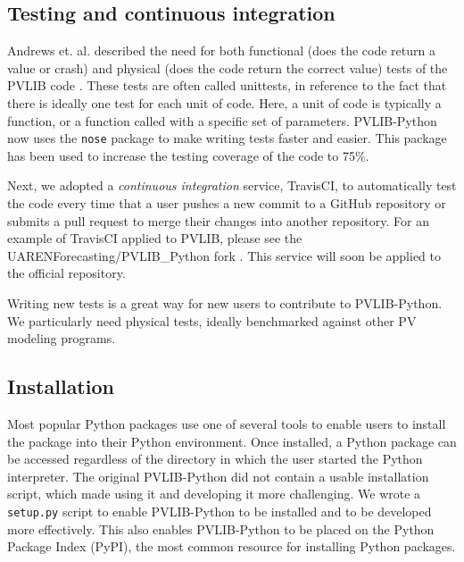 \documentclass[conference]{IEEEtran}
\begin{document}
\subsection{Testing and continuous integration}

Andrews et. al. described the need for both functional (does the code return a value or crash) and physical (does the code return the correct value) tests of the PVLIB code \cite{andrews}.
These tests are often called unittests, in reference to the fact that there is ideally one test for each unit of code.
Here, a unit of code is typically a function, or a function called with a specific set of parameters.
PVLIB-Python now uses the \texttt{nose} package \cite{nosetests} to make writing tests faster and easier.
This package has been used to increase the testing coverage of the code to 75\%.

Next, we adopted a \emph{continuous integration} service, TravisCI, to automatically test the code every time that a user pushes a new commit to a GitHub repository or submits a pull request to merge their changes into another repository. 
For an example of TravisCI applied to PVLIB, please see the UARENForecasting/PVLIB{\_}Python fork \cite{uaren-pvlib}.
This service will soon be applied to the official repository.

Writing new tests is a great way for new users to contribute to PVLIB-Python. We particularly need physical tests, ideally benchmarked against other PV modeling programs.


\subsection{Installation}

Most popular Python packages use one of several tools to enable users to install the package into their Python environment.
Once installed, a Python package can be accessed regardless of the directory in which the user started the Python interpreter.
The original PVLIB-Python did not contain a usable installation script, which made using it and developing it more challenging.
We wrote a \texttt{setup.py} script to enable PVLIB-Python to be installed and to be developed more effectively.
This also enables PVLIB-Python to be placed on the Python Package Index (PyPI), the most common resource for installing Python packages.


\end{document}
